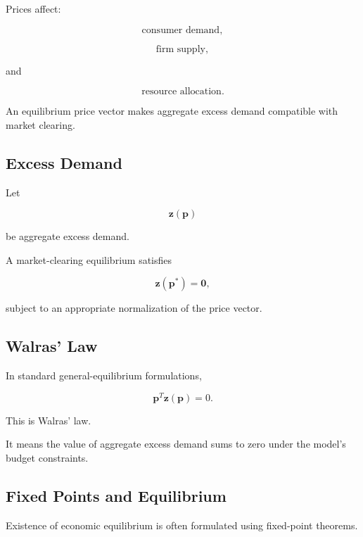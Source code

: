 Prices affect:

\[
\boxed{
\text{consumer demand},
}
\]

\[
\boxed{
\text{firm supply},
}
\]

and

\[
\boxed{
\text{resource allocation}.
}
\]

An equilibrium price vector makes aggregate excess demand compatible with
market clearing.

\subsection{Excess Demand}
\label{subsec:excess-demand}

Let

\[
\mathbf{z}(\mathbf{p})
\]

be aggregate excess demand.

A market-clearing equilibrium satisfies

\[
\boxed{
\mathbf{z}(\mathbf{p}^*)=\mathbf{0},
}
\]

subject to an appropriate normalization of the price vector.

\subsection{Walras' Law}
\label{subsec:walras-law}

In standard general-equilibrium formulations,

\[
\boxed{
\mathbf{p}^T
\mathbf{z}(\mathbf{p})
=
0.
}
\]

This is Walras' law.

It means the value of aggregate excess demand sums to zero under the model's
budget constraints.

\subsection{Fixed Points and Equilibrium}
\label{subsec:fixed-points-economic-equilibrium}

Existence of economic equilibrium is often formulated using fixed-point
theorems.

